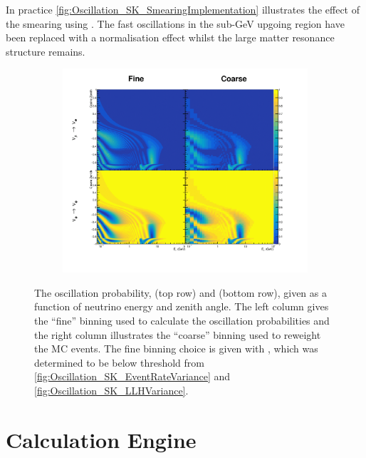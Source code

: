 In practice \autoref{fig:Oscillation_SK_SmearingImplementation} illustrates the effect of the smearing using . The fast oscillations in the sub-GeV upgoing region have been replaced with a normalisation effect whilst the large matter resonance structure remains.

\begin{figure}[h]
  \begin{subfigure}[t]{\textwidth}
    \includegraphics[width=\textwidth, trim={0mm 0mm 0mm 0mm}, clip,page=1]{Figures/Oscillation/SmearingImplementation.pdf}
  \end{subfigure}
  \caption{The oscillation probability,  (top row) and  (bottom row), given as a function of neutrino energy and zenith angle. The left column gives the ``fine'' binning used to calculate the oscillation probabilities and the right column illustrates the ``coarse'' binning used to reweight the MC events. The fine binning choice is given with , which was determined to be below threshold from \autoref{fig:Oscillation_SK_EventRateVariance} and \autoref{fig:Oscillation_SK_LLHVariance}.}
  \label{fig:Oscillation_SK_SmearingImplementation}
\end{figure}

\clearpage

\section{Calculation Engine}
\label{sec:Oscillation_CalculationEngine}

